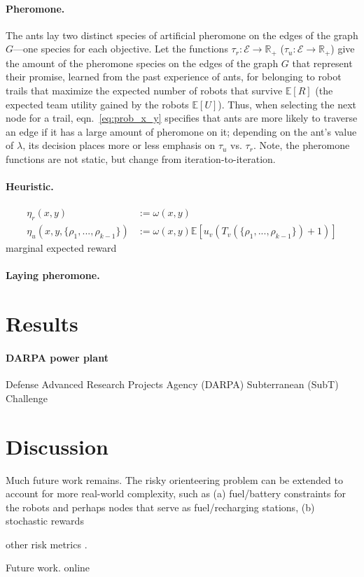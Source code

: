 \documentclass[11pt, oneside]{article}
\begin{document}
\paragraph{Pheromone.} The ants lay two distinct species of artificial pheromone on the edges of the graph $G$---one species for each objective. Let the functions $\tau_r:\mathcal{E}\rightarrow \mathbb{R}_+$ ($\tau_u:\mathcal{E}\rightarrow \mathbb{R}_+$) give the amount of the pheromone species on the edges of the graph $G$ that represent their promise, learned from the past experience of ants, for belonging to robot trails that maximize the expected number of robots that survive $\mathbb{E}[R]$ (the expected team utility gained by the robots $\mathbb{E}[U]$). Thus, when selecting the next node for a trail, eqn.~\ref{eq:prob_x_y} specifies that ants are more likely to traverse an edge if it has a large amount of pheromone on it; depending on the ant's value of $\lambda$, its decision places more or less emphasis on $\tau_u$ vs. $\tau_r$. Note, the pheromone functions are not static, but change from iteration-to-iteration. 


\paragraph{Heuristic.}

\begin{align}
\eta_r(x, y) & := \omega(x, y) \\
\eta_u(x, y, \{\rho_1, ..., \rho_{k-1}\}) & :=  \omega(x, y) \mathbb{E}[u_v(T_v(\{\rho_1, ..., \rho_{k-1}\})+1)]
\end{align}
marginal expected reward


\paragraph{Laying pheromone.}

\section{Results}

\paragraph{DARPA power plant}

Defense Advanced Research Projects Agency (DARPA) Subterranean (SubT) Challenge \cite{chung2023into}


\section{Discussion}

Much future work remains.
The risky orienteering problem can be extended to account for more real-world complexity, such as (a) fuel/battery constraints for the robots and perhaps nodes that serve as fuel/recharging stations, (b) stochastic rewards

other risk metrics \cite{majumdar2020should}.

Future work. online




\end{document}
